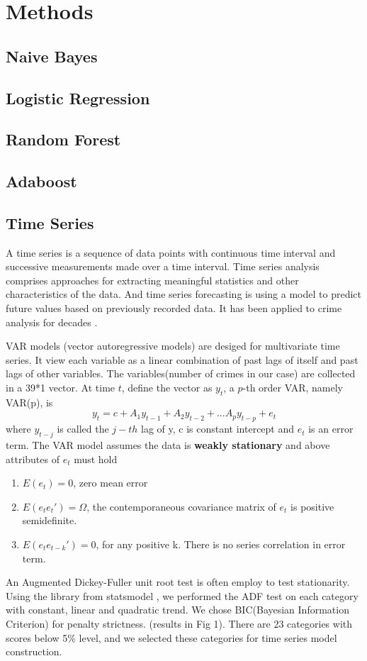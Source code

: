 \documentclass[11pt,conference]{IEEEtran}
\begin{document}
\section{Methods}
\subsection{Naive Bayes}
\subsection{Logistic Regression}
\subsection{Random Forest}
\subsection{Adaboost }
\subsection{Time Series}
A time series is a sequence of data points with continuous time interval and successive measurements made over a time interval. Time series analysis comprises approaches for extracting meaningful statistics and other characteristics of the data. And time series forecasting is using a model to predict future values based on previously recorded data. It has been applied to crime analysis for decades \cite{2}.

VAR models (vector autoregressive models) are desiged for multivariate time series. It view each variable as a linear combination of past lags of itself and past lags of other variables. The variables(number of crimes in our case) are collected in a 39*1 vector. At time $t$, define the vector as $y_t$, a  $p$-th order VAR, namely VAR(p), is $$y_t = c + A_1y_{t-1} + A_2y_{t-2} + ... A_py_{t-p} + e_t$$ where $y_{t-j}$ is called the $j-th$ lag of y, c is constant intercept and $e_t$ is an error term. The VAR model assumes the data is \textbf{weakly stationary} and above attributes of $e_t$ must hold
\begin{enumerate}
	\item $E(e_t) = 0$, zero mean error
	\item $E(e_t{e_t}') = \Omega$, the contemporaneous covariance matrix of $e_t$ is positive semidefinite.
	\item $E(e_t{e_{t-k}}') = 0$, for any positive k. There is no series correlation in error term.
\end{enumerate}
An Augmented Dickey-Fuller unit root test \cite{3} is often employ to test stationarity.  Using the library from statsmodel \cite{4} , we performed the ADF test on each category with constant, linear and quadratic trend.  We chose BIC(Bayesian Information Criterion) for penalty strictness. (results in Fig 1). There are 23 categories with scores below 5\% level, and we selected these categories for time series model construction.
\end{document}

